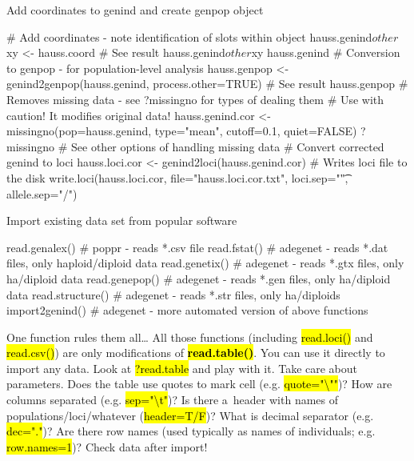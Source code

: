 \documentclass[compress, ucs, xelatex, 11pt, xcolor=svgnames,
  hyperref={
    bookmarks=true,
    unicode=true,
    colorlinks=true,
    pdftitle={Molecular data in R},
    plainpages=false,
    pdfauthor={Vojtech Zeisek},
    pdfsubject={Course about phylogeny and evolution in R},
    pdfcreator={XeLaTeX},
    pdfkeywords={R, evolution, phylogeny, molecular data},
    linkcolor=Tomato,
    anchorcolor=SaddleBrown,
    citecolor=Goldenrod,
    filecolor=DarkMagenta,
    menucolor=Sienna,
    urlcolor=DarkTurquoise,
    pdftex},
  url={hyphens, lowtilde} %
  ]{beamer}
\renewcommand{\texttt}[1]{\hl{\ttfamily #1}}
\begin{document}
\begin{frame}[fragile]{Add coordinates to genind and create genpop object}
  \begin{spluscode}
    # Add coordinates - note identification of slots within object
    hauss.genind$other$xy <- hauss.coord
    # See result
    hauss.genind$other$xy
    hauss.genind
    # Conversion to genpop - for population-level analysis
    hauss.genpop <- genind2genpop(hauss.genind, process.other=TRUE)
    # See result
    hauss.genpop
    # Removes missing data - see ?missingno for types of dealing them
    # Use with caution! It modifies original data!
    hauss.genind.cor <- missingno(pop=hauss.genind, type="mean",
      cutoff=0.1, quiet=FALSE)
    ?missingno # See other options of handling missing data
    # Convert corrected genind to loci
    hauss.loci.cor <- genind2loci(hauss.genind.cor)
    # Writes loci file to the disk
    write.loci(hauss.loci.cor, file="hauss.loci.cor.txt",
      loci.sep="\t", allele.sep="/")
  \end{spluscode}
\end{frame}

\begin{frame}[fragile]{Import existing data set from popular software}
  \begin{spluscode}
    read.genalex() # poppr - reads *.csv file
    read.fstat() # adegenet - reads *.dat files, only haploid/diploid data
    read.genetix() # adegenet - reads *.gtx files, only ha/diploid data
    read.genepop() # adegenet - reads *.gen files, only ha/diploid data
    read.structure() # adegenet - reads *.str files, only ha/diploids
    import2genind() # adegenet - more automated version of above functions
  \end{spluscode}
  \begin{block}{One function rules them all\ldots}
    All those functions (including \texttt{read.loci()} and \texttt{read.csv()}) are only modifications of \textbf{\texttt{read.table()}}. You can use it directly to import any data. Look at \texttt{?read.table} and play with it. Take care about parameters. Does the table use quotes to mark cell (e.g. \texttt{quote="\textbackslash ""})? How are columns separated (e.g. \texttt{sep="\textbackslash t"})? Is there a~header with names of populations/loci/whatever (\texttt{header=T/F})? What is decimal separator (e.g. \texttt{dec="."})? Are there row names (used typically as names of individuals; e.g. \texttt{row.names=1})? \alert{Check data after import!}
  \end{block}
\end{frame}
\end{document}
